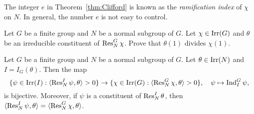 The integer $e$ in Theorem~\ref{thm:Clifford} is known as the \emph{ramification index} of $\chi$ on $N$. In general, the number $e$ is not easy to control. 

\begin{exercise}
\label{xca:Clifford_divisibility}
    Let $G$ be a finite group and $N$ be a normal subgroup of $G$. Let $\chi\in\operatorname{Irr}(G)$ and $\theta$ 
    be an irreducible constituent of $\operatorname{Res}_N^G\chi$. 
    Prove that $\theta(1)$ divides $\chi(1)$. 
\end{exercise}



\begin{theorem}
\label{thm:Clifford_correspondence}
    Let $G$ be a finite group and $N$ be a normal subgroup of $G$. Let $\theta\in\operatorname{Irr}(N)$ and $I=I_G(\theta)$.  Then 
    the map 
    \[
    \{\psi\in\operatorname{Irr}(I):\langle\operatorname{Res}_N^I\psi,\theta\rangle>0\}\to 
    \{\chi\in\operatorname{Irr}(G):\langle\operatorname{Res}_N^G\chi,\theta\rangle>0\},\quad 
    \psi\mapsto\operatorname{Ind}_I^G\psi,
    \]
    is bijective. Moreover, if $\psi$ is a constituent of $\operatorname{Res}_N^I\theta$, then 
    $\langle\operatorname{Res}_N^I\psi,\theta\rangle=\langle\operatorname{Res}_N^G\chi,\theta\rangle$. 
\end{theorem}

